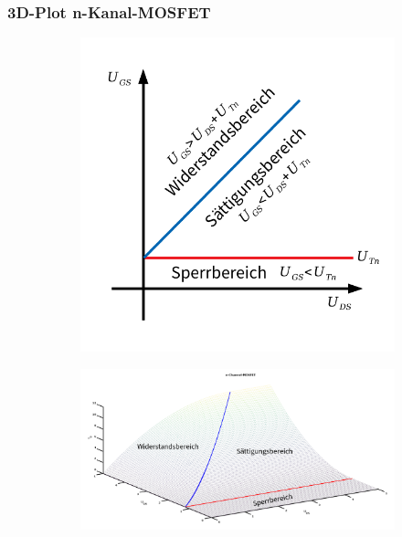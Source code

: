 \documentclass[a4paper,11pt]{article}
\begin{document}
\subsubsection*{3D-Plot n-Kanal-MOSFET}
\begin{figure}[H]
\begin{subfigure}{0.32\textwidth}
	\begin{center}
		\includegraphics[width=\textwidth]{img/nmosfet_operationmodes.pdf}
	\end{center}
\end{subfigure}
\begin{subfigure}{0.67\textwidth}
	\begin{center}
		\includegraphics[width=\textwidth]{img/nmosfet_3dplot}
	\end{center}
\end{subfigure}
\end{figure}
\end{document}
